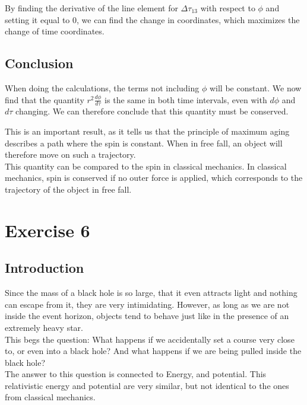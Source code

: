 \documentclass[reprint,english,notitlepage]{revtex4-2}
\begin{document}
        By finding the derivative of the line element for $\Delta \tau_{13}$ with respect to $\phi$ and setting it equal to 0, we can find the change in coordinates, which maximizes the change of time coordinates.

    \subsection{Conclusion}\label{subsec:conclusion2}
        When doing the calculations, the terms not including $\phi$ will be constant.
        We now find that the quantity $r^2 \frac{d\phi}{d\tau}$ is the same in both time intervals, even with $d\phi$ and $d\tau$ changing.
        We can therefore conclude that this quantity must be conserved.

        This is an important result, as it tells us that the principle of maximum aging describes a path where the spin is constant.
        When in free fall, an object will therefore move on such a trajectory.\\

        This quantity can be compared to the spin in classical mechanics.
        In classical mechanics, spin is conserved if no outer force is applied, which corresponds to the trajectory of the object in free fall.




\section{Exercise 6}\label{sec:exercise-6}
    \subsection{Introduction}\label{subsec:introduction6}
        Since the mass of a black hole is so large, that it even attracts light and nothing can escape from it, they are very intimidating.
        However, as long as we are not inside the event horizon, objects tend to behave just like in the presence of an extremely heavy star.\\
        This begs the question: What happens if we accidentally set a course very close to, or even into a black hole?
        And what happens if we are being pulled inside the black hole?\\
        The answer to this question is connected to Energy, and potential.
        This relativistic energy and potential are very similar, but not identical to the ones from classical mechanics.
\end{document}
